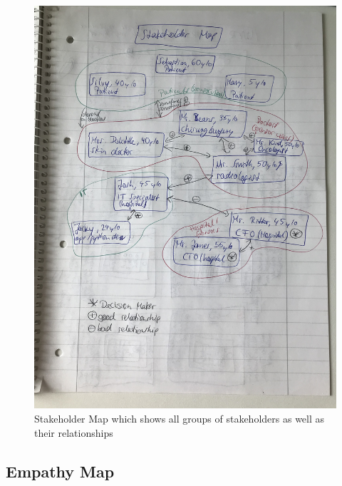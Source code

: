 \begin{figure}[h!]
	\centering
	\includegraphics[width=1\textwidth]{images/stakeholdermap.jpg}
	\caption{Stakeholder Map which shows all groups of stakeholders as well as their relationships}
	\label{verticallatter}
\end{figure}

\subsection{Empathy Map}


